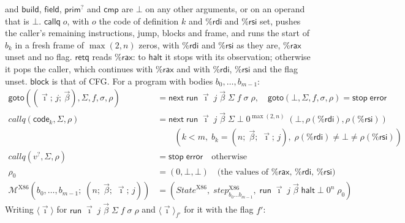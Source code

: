 \documentclass[10pt]{article}
\theoremstyle{acmplain}
\newcommand{\key}[1]{\mathsf{#1}}
\newcommand{\nxt}{\key{next}\;}
\newcommand{\stp}{\key{stop}\;}
\newcommand{\error}{\key{error}}
\newcommand{\Mach}[1]{\mathcal{M}^{#1}}
\newcommand{\step}[1]{\mathit{step}^{#1}}
\newcommand{\codeV}[1]{\key{code}_{#1}}
\newcommand{\halt}{\key{halt}}
\newcommand{\rax}{\%\key{rax}}
\newcommand{\rdi}{\%\key{rdi}}
\newcommand{\rsi}{\%\key{rsi}}
\newcommand{\xrun}{\key{run}}
\begin{document}
and $\key{build}$, $\key{field}$, $\key{prim}^?$ and $\key{cmp}$ are
$\bot$ on any other arguments, or on an operand that is $\bot$.
$\key{callq}\; o$, with $o$ the code of definition $k$ and $\rdi$ and
$\rsi$ set, pushes the caller's remaining instructions, jump, blocks and
frame, and runs the start of $b_k$ in a fresh frame of $\max(2, n)$
zeros, with $\rdi$ and $\rsi$ as they are, $\rax$ unset and no flag.
$\key{retq}$ reads $\rax$: to $\halt$ it stops with its observation;
otherwise it pops the caller, which continues with $\rax$ and with
$\rdi$, $\rsi$ and the flag unset. $\key{block}$ is that of CFG. For a program with bodies
$b_0, \ldots, b_{m-1}$:
\begin{align*}
  \key{goto}((\vec{\imath};\, j;\, \vec{\beta}), \Sigma, f, \sigma, \rho) &= \nxt \xrun\;\vec{\imath}\;j\;\vec{\beta}\;\Sigma\;f\;\sigma\;\rho, \quad
  \key{goto}(\bot, \Sigma, f, \sigma, \rho) = \stp \error \\
  \mathit{callq}(\codeV{k}, \Sigma, \rho) &=
    \nxt \xrun\;\vec{\imath}\;j\;\vec{\beta}\;\Sigma\;\bot\;0^{\max(2,n)}\;(\bot, \rho(\rdi), \rho(\rsi)) \\
    &\qquad (k < m,\; b_k = (n;\; \vec{\beta};\; \vec{\imath};\, j),\; \rho(\rdi) \neq \bot \neq \rho(\rsi)) \\
  \mathit{callq}(v^?, \Sigma, \rho) &= \stp \error \quad \text{otherwise} \\[1ex]
  \rho_0 &= (0, \bot, \bot) \quad \text{(the values of $\rax$, $\rdi$, $\rsi$)} \\
  \Mach{\mathrm{X86}}(b_0, \ldots, b_{m-1};\; (n;\; \vec{\beta};\; \vec{\imath};\, j)) &=
    (\mathit{State}^{\mathrm{X86}},\; \step{\mathrm{X86}}_{b_0 \ldots b_{m-1}},\; \xrun\;\vec{\imath}\;j\;\vec{\beta}\;\halt\;\bot\;0^n\;\rho_0)
\end{align*}
Writing $\langle \vec{\imath} \rangle$ for $\xrun\;\vec{\imath}\;j\;\vec{\beta}\;\Sigma\;f\;\sigma\;\rho$
and $\langle \vec{\imath} \rangle_{f'}$ for it with the flag $f'$:
\end{document}
